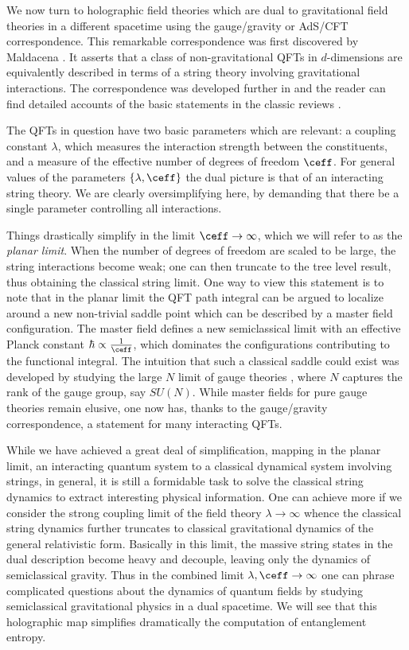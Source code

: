 \documentclass[12pt,openany]{book}
\begin{document}
We now turn to holographic field theories which are dual to gravitational field theories in a different spacetime using the gauge/gravity or AdS/CFT correspondence.  This remarkable correspondence was first discovered by Maldacena \cite{Maldacena:1997re}. It  asserts that a class of non-gravitational QFTs in $d$-dimensions are equivalently described in terms of a string  theory involving gravitational interactions. The correspondence was developed further in \cite{Gubser:1998bc,Witten:1998qj} and the reader can find detailed accounts of the basic statements in the classic reviews \cite{Aharony:1999ti,DHoker:2002aw}.

 The QFTs in question have two basic parameters which are relevant: a coupling constant $\lambda$, which measures the interaction strength between the constituents, and a measure of the effective number of degrees of freedom $\ceff$. For general values of  the parameters $\{\lambda, \ceff\}$ the dual picture is that of an interacting string theory. We are clearly oversimplifying here, by demanding that there be a single parameter controlling all interactions.

Things drastically simplify in the limit  $\ceff\to \infty$, which we will refer to as the \emph{planar limit}.
When the number of degrees of freedom are scaled to be large, the string interactions become weak;  one can then truncate to the tree level result,  thus obtaining the classical string limit. One way to view this statement is to note that in the planar limit the QFT path integral can be argued to localize around a new non-trivial saddle point which can be described by a master field configuration. The master field defines a new semiclassical limit with an effective Planck constant $\hbar \propto \frac{1}{\ceff}$, which dominates the configurations contributing to the functional integral.  The intuition that such a classical saddle could exist was developed by studying the large $N$ limit of gauge theories \cite{tHooft:1973jz,Witten:1979kh}, where $N$ captures the rank of the gauge group, say $SU(N)$. While master fields for pure gauge theories remain elusive, one now has, thanks to the gauge/gravity correspondence, a statement for many interacting QFTs.

 While we have achieved a great deal of simplification, mapping in the planar limit, an interacting quantum system to a classical dynamical system involving strings, in general, it is still  a formidable task to solve the classical string dynamics to extract interesting physical information. One can achieve more if we consider the strong coupling limit of the field theory $\lambda \to \infty$ whence the classical string dynamics further truncates to classical gravitational dynamics of the general relativistic form. Basically in this limit, the massive string states in the dual description become heavy and decouple, leaving only the dynamics of semiclassical  gravity. Thus in the combined limit $\lambda, \ceff \to \infty$ one can phrase complicated questions about the dynamics of quantum fields by studying semiclassical gravitational physics in a dual spacetime.
 We will see that this holographic map simplifies dramatically the computation of entanglement entropy.
\end{document}

